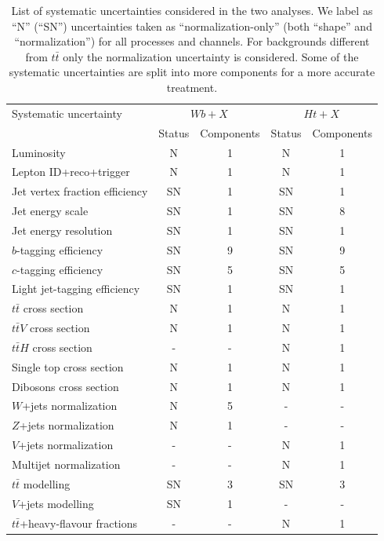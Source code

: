 \begin{table}[htb]
\centering
\begin{tabular}{lcccc}
\toprule
Systematic uncertainty & \multicolumn{2}{c}{ $Wb+X$ } & \multicolumn{2}{c}{ $Ht+X$ }\\
 & Status  & Components & Status  & Components\\
\midrule
Luminosity                  &  N & 1 &  N & 1\\
Lepton ID+reco+trigger      &  N & 1 &  N & 1\\
Jet vertex fraction efficiency & SN & 1 & SN & 1\\
Jet energy scale            & SN & 1 & SN & 8\\
Jet energy resolution       & SN & 1 & SN & 1\\
$b$-tagging efficiency      & SN & 9 & SN & 9\\
$c$-tagging efficiency      & SN & 5 & SN & 5\\
Light jet-tagging efficiency    & SN & 1 & SN & 1\\
$t\bar{t}$ cross section    &  N & 1 &  N & 1\\
$t\bar{t}V$ cross section   &  N & 1 &  N & 1\\
$t\bar{t}H$ cross section   & - & - &  N & 1\\
Single top cross section    &  N & 1 &  N & 1\\
Dibosons cross section      &  N & 1 &  N & 1\\
$W$+jets normalization      &  N & 5 &  - & -\\
$Z$+jets normalization      &  N & 1 &  - & -\\
$V$+jets normalization      &  - & - &  N & 1\\
Multijet normalization      &  - & - &  N & 1\\
$t\bar{t}$ modelling        & SN & 3 & SN & 3\\
$V$+jets modelling         & SN & 1 &  - & -\\
$t\bar{t}$+heavy-flavour fractions &  - & -& N & 1\\
\bottomrule
\end{tabular}
\caption{\label{tab:SystSummary} 
List of systematic uncertainties considered in the two analyses. 
We label as ``N'' (``SN'') uncertainties taken as ``normalization-only'' 
(both ``shape'' and ``normalization'')
for all processes and channels. 
For backgrounds different from $t\bar{t}$ only the normalization 
uncertainty is considered. 
Some of the systematic uncertainties are split into more 
components for a more
accurate treatment. }
\end{table}


